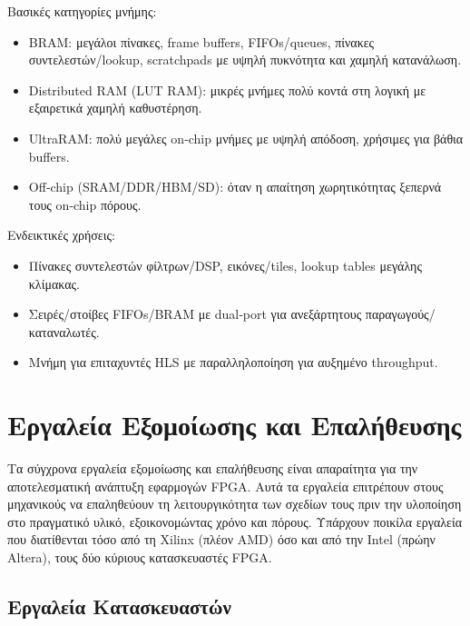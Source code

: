 Βασικές κατηγορίες μνήμης:
\begin{itemize}
  \item BRAM: μεγάλοι πίνακες, frame buffers, FIFOs/queues, πίνακες συντελεστών/lookup, scratchpads με υψηλή πυκνότητα και χαμηλή κατανάλωση.
  \item Distributed RAM (LUT RAM): μικρές μνήμες πολύ κοντά στη λογική με εξαιρετικά χαμηλή καθυστέρηση.
  \item UltraRAM: πολύ μεγάλες on‑chip μνήμες με υψηλή απόδοση, χρήσιμες για βάθια buffers.
  \item Off‑chip (SRAM/DDR/HBM/SD): όταν η απαίτηση χωρητικότητας ξεπερνά τους on‑chip πόρους.
\end{itemize}

Ενδεικτικές χρήσεις:
\begin{itemize}
  \item Πίνακες συντελεστών φίλτρων/DSP, εικόνες/tiles, lookup tables μεγάλης κλίμακας.
  \item Σειρές/στοίβες FIFOs/BRAM με dual‑port για ανεξάρτητους παραγωγούς/καταναλωτές.
  \item Μνήμη για επιταχυντές HLS με παραλληλοποίηση για αυξημένο throughput.
\end{itemize}


\section{Εργαλεία Εξομοίωσης και Επαλήθευσης}


Τα σύγχρονα εργαλεία εξομοίωσης και επαλήθευσης είναι απαραίτητα για την αποτελεσματική ανάπτυξη εφαρμογών FPGA.
Αυτά τα εργαλεία επιτρέπουν στους μηχανικούς να επαληθεύουν τη λειτουργικότητα των σχεδίων τους πριν την υλοποίηση στο πραγματικό υλικό, εξοικονομώντας χρόνο και πόρους.
Υπάρχουν ποικίλα εργαλεία που διατίθενται τόσο από τη Xilinx (πλέον AMD) όσο και από την Intel (πρώην Altera), τους δύο κύριους κατασκευαστές FPGA.

\subsection{Εργαλεία Κατασκευαστών}

